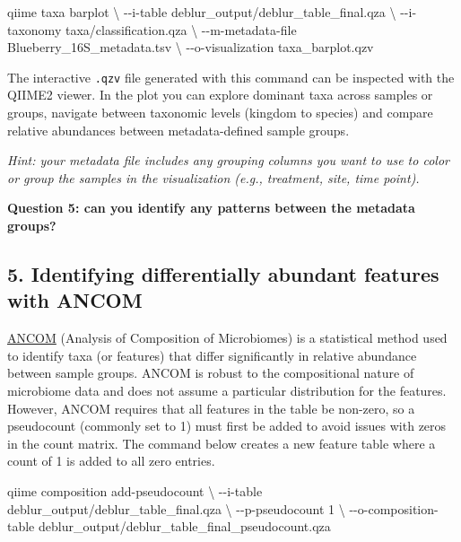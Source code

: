 \documentclass[
]{book}
\newenvironment{Shaded}{\begin{snugshade}}{\end{snugshade}}
\newcommand{\AttributeTok}[1]{\textcolor[rgb]{0.13,0.29,0.53}{#1}}
\newcommand{\DataTypeTok}[1]{\textcolor[rgb]{0.13,0.29,0.53}{#1}}
\newcommand{\ExtensionTok}[1]{#1}
\newcommand{\NormalTok}[1]{#1}
\begin{document}
\begin{Shaded}
\begin{Highlighting}[]
\ExtensionTok{qiime}\NormalTok{ taxa barplot }\DataTypeTok{\textbackslash{}}
  \AttributeTok{{-}{-}i{-}table}\NormalTok{ deblur\_output/deblur\_table\_final.qza }\DataTypeTok{\textbackslash{}}
  \AttributeTok{{-}{-}i{-}taxonomy}\NormalTok{ taxa/classification.qza }\DataTypeTok{\textbackslash{}}
  \AttributeTok{{-}{-}m{-}metadata{-}file}\NormalTok{ Blueberry\_16S\_metadata.tsv }\DataTypeTok{\textbackslash{}}
  \AttributeTok{{-}{-}o{-}visualization}\NormalTok{ taxa\_barplot.qzv}
\end{Highlighting}
\end{Shaded}

The interactive \texttt{.qzv} file generated with this command can be inspected with the QIIME2 viewer. In the plot you can explore dominant taxa across samples or groups, navigate between taxonomic levels (kingdom to species) and compare relative abundances between metadata-defined sample groups.

\emph{Hint: your metadata file includes any grouping columns you want to use to color or group the samples in the visualization (e.g., treatment, site, time point).}

\textbf{Question 5: can you identify any patterns between the metadata groups?}

\subsection{5. Identifying differentially abundant features with ANCOM}\label{ancom}

\href{https://www.ncbi.nlm.nih.gov/pmc/articles/PMC4450248/}{ANCOM} (Analysis of Composition of Microbiomes) is a statistical method used to identify taxa (or features) that differ significantly in relative abundance between sample groups. ANCOM is robust to the compositional nature of microbiome data and does not assume a particular distribution for the features. However, ANCOM requires that all features in the table be non-zero, so a pseudocount (commonly set to 1) must first be added to avoid issues with zeros in the count matrix. The command below creates a new feature table where a count of 1 is added to all zero entries.

\begin{Shaded}
\begin{Highlighting}[]
\ExtensionTok{qiime}\NormalTok{ composition add{-}pseudocount }\DataTypeTok{\textbackslash{}}
  \AttributeTok{{-}{-}i{-}table}\NormalTok{ deblur\_output/deblur\_table\_final.qza }\DataTypeTok{\textbackslash{}}
  \AttributeTok{{-}{-}p{-}pseudocount}\NormalTok{ 1 }\DataTypeTok{\textbackslash{}}
  \AttributeTok{{-}{-}o{-}composition{-}table}\NormalTok{ deblur\_output/deblur\_table\_final\_pseudocount.qza}
\end{Highlighting}
\end{Shaded}
\end{document}
